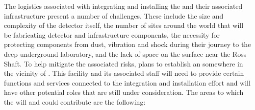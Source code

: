 The logistics associated with integrating and installing the
 and their associated infrastructure present
a number of challenges. %
These include the size and
complexity of the detector itself, the number of sites around the
world that will be fabricating detector and infrastructure components,
the necessity for protecting components from dust, vibration and shock
during their journey to the deep underground laboratory, and the lack
of space on the surface near the Ross Shaft. To help
mitigate the associated risks,  plans to establish an
 somewhere in the vicinity of \surf. This facility
and its associated staff will need to provide certain functions and
services connected to the   integration and
installation effort and will have other potential roles that are still under
consideration.  The areas to which the  will and could
contribute are the following:
